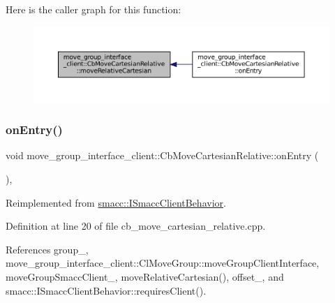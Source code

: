 Here is the caller graph for this function\+:
\nopagebreak
\begin{figure}[H]
\begin{center}
\leavevmode
\includegraphics[width=350pt]{classmove__group__interface__client_1_1CbMoveCartesianRelative_a85b6b1c8738c372174dff8fd98ec1b7a_icgraph}
\end{center}
\end{figure}
\mbox{\label{classmove__group__interface__client_1_1CbMoveCartesianRelative_a549d1612f552cab64208c37b7e383e1c}} 
\subsubsection{\texorpdfstring{on\+Entry()}{onEntry()}}
{\footnotesize\ttfamily void move\+\_\+group\+\_\+interface\+\_\+client\+::\+Cb\+Move\+Cartesian\+Relative\+::on\+Entry (\begin{DoxyParamCaption}{ }\end{DoxyParamCaption})\hspace{0.3cm}{\ttfamily [override]}, {\ttfamily [virtual]}}



Reimplemented from \hyperlink{classsmacc_1_1ISmaccClientBehavior_a3ec24a839087c550e1d62a81e48cf530}{smacc\+::\+I\+Smacc\+Client\+Behavior}.



Definition at line 20 of file cb\+\_\+move\+\_\+cartesian\+\_\+relative.\+cpp.



References group\+\_\+, move\+\_\+group\+\_\+interface\+\_\+client\+::\+Cl\+Move\+Group\+::move\+Group\+Client\+Interface, move\+Group\+Smacc\+Client\+\_\+, move\+Relative\+Cartesian(), offset\+\_\+, and smacc\+::\+I\+Smacc\+Client\+Behavior\+::requires\+Client().


